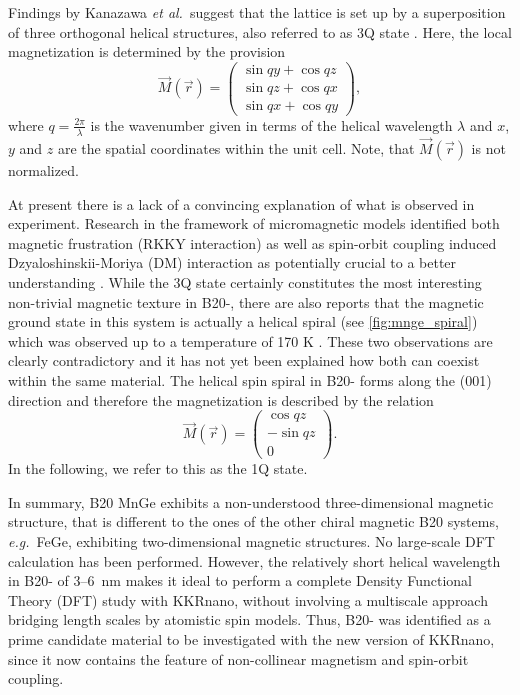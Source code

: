 \documentclass [a4paper, 12pt]{article}
\newcommand{\beq}{\begin{equation}}
\newcommand{\eeq}{\end{equation}}
\begin{document}
Findings by Kanazawa \textit{et al.}\ suggest that the lattice is set up by a superposition of three orthogonal
helical structures, also referred to as 3Q state \cite{kanazawa_noncentrosymmetric_2017}. 
Here, the local magnetization is determined by the provision
\beq
\label{eq:3q_formula}
\vec{M}(\vec{r}) =
\begin{pmatrix}
	\sin{qy} + \cos{qz} \\
	\sin{qz} + \cos{qx} \\
	\sin{qx} + \cos{qy}
\end{pmatrix},
\eeq
where $q=\frac{2\pi}{\lambda}$ is the wavenumber given in terms of the helical wavelength $\lambda$ and
$x$, $y$ and $z$ are the spatial coordinates within the unit cell.
Note, that $\vec{M}(\vec{r})$ is not normalized.

At present there is a lack of a convincing explanation
of what is observed in experiment. Research in the framework of micromagnetic models identified both
magnetic frustration (RKKY interaction) as well as spin-orbit coupling induced Dzyaloshinskii-Moriya (DM)
interaction as potentially crucial to a better
understanding \cite{altynbaev_hidden_2016,koretsune_control_2015}. 
While the 3Q state certainly constitutes the most interesting non-trivial magnetic texture 
in B20-, there are also reports that the magnetic ground state in this system is
actually a helical spiral (see \cref{fig:mnge_spiral}) \cite{yaouanc_magnetic_2017} which was observed up
to a temperature of 170 K \cite{makarova_neutron_2012}.
These two observations are clearly contradictory and it has not yet been explained how
both can coexist within the same material.
The helical spin spiral in B20- forms along the (001) direction and therefore the magnetization
is described by the relation
\beq
\label{eq:1q_spiral}
\vec{M}(\vec{r}) =
\begin{pmatrix}
	 \cos{qz} \\
	-\sin{qz}  \\
	0
\end{pmatrix}
.
\eeq
In the following, we refer to this as the 1Q state.

In summary, B20 MnGe exhibits a non-understood three-dimensional magnetic structure,
that is different to the ones of the other chiral magnetic B20 systems, \textit{e.g.}\ FeGe,
exhibiting two-dimensional magnetic structures.  No large-scale DFT calculation  has been performed.
However, the relatively short  helical wavelength in B20-  of 3--6~nm makes it ideal to perform
a complete Density Functional Theory (DFT) 
study with KKRnano, without involving a multiscale approach bridging length scales by atomistic spin models. 
Thus, B20- was identified as a prime candidate material to be investigated with the new
version of KKRnano, since it  now contains the feature of non-collinear magnetism and spin-orbit coupling.
\end{document}
